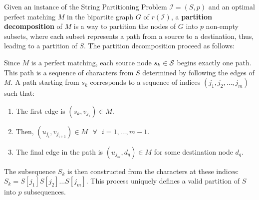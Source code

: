 \begin{definition} \label{def:partition_decomposition}
    Given an instance of the String Partitioning Problem $\mathcal{I}=(S, p)$ and an optimal perfect matching $M$ in the bipartite graph $G$ of $r(\mathcal{I})$, a \textbf{partition decomposition} of $M$ is a way to partition the nodes of $G$ into $p$ non-empty subsets, where each subset represents a path from a source to a destination, thus, leading to a partition of $S$. The partition decomposition proceed as follows:

    Since $M$ is a perfect matching, each source node $s_k \in \mathcal{S}$ begins exactly one path. This path is a sequence of characters from $S$ determined by following the edges of $M$. A path starting from $s_k$ corresponds to a sequence of indices $(j_1, j_2, \dots, j_m)$ such that:
    \begin{enumerate}[leftmargin=25pt]
        \item The first edge is $(s_k, v_{j_1}) \in M$.
        \item Then, $(u_{j_i}, v_{j_{i+1}}) \in M \text{ } \forall \text{ } i=1,\dots,m-1$.
        \item The final edge in the path is $(u_{j_m}, d_q) \in M$ for some destination node $d_q$.
    \end{enumerate}
    The subsequence $S_k$ is then constructed from the characters at these indices: $S_k = S[j_1]S[j_2]\dots S[j_m]$. This process uniquely defines a valid partition of $S$ into $p$ subsequences.
\end{definition}

